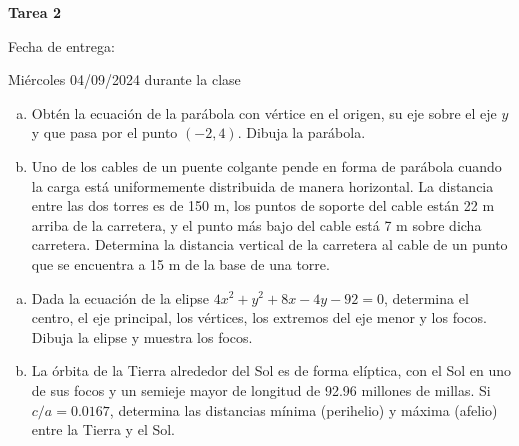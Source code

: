 \documentclass[10pt]{exam}
\begin{document}
\centering


\Large 
\textbf{Tarea 2}

\normalsize
Fecha de entrega: 

Miércoles 04/09/2024 durante la clase




\pointformat{\bfseries\boldmath(\thepoints)}
\vskip10pt

\begin{questions}
    \question 
    
    \begin{enumerate}[a)]
        \item Obtén la ecuación de la parábola con vértice en el origen, su eje sobre el eje $y$ y que pasa por el punto $(-2,4)$. Dibuja la parábola.
        \item Uno de los cables de un puente colgante pende en forma de parábola cuando la carga está uniformemente distribuida de manera horizontal. La distancia entre las dos torres es de 150 m, los puntos de soporte del cable están 22 m arriba de la carretera, y el punto más bajo del cable está 7 m sobre dicha carretera. Determina la distancia vertical de la carretera al cable de un punto que se encuentra a 15 m de la base de una torre.
    \end{enumerate}{}

    \question 
    \begin{enumerate}[a)]
        \item Dada la ecuación de la elipse $4x^2+y^2+8x-4y-92=0$, determina el centro, el eje principal, los vértices, los extremos del eje menor y los focos. Dibuja la elipse y muestra los focos.
        \item La órbita de la Tierra alrededor del Sol es de forma elíptica, con el Sol en uno de sus focos y un semieje mayor de longitud de 92.96 millones de millas. Si $c/a=0.0167$, determina las distancias mínima (perihelio) y máxima (afelio) entre la Tierra y el Sol.
    \end{enumerate}{}
    

\end{questions}
\end{document}
